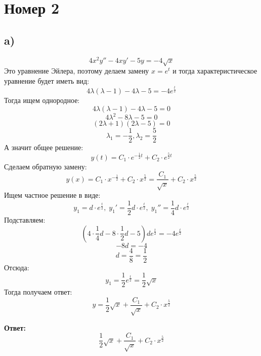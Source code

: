 \documentclass[a4paper,12pt]{article}
\begin{document}
\section*{Номер 2}
\subsection*{a)}
\[
4x^2y'' - 4xy' -5y = -4 \sqrt{x}
\]
Это уравнение Эйлера, поэтому делаем замену $x = e^t$ и тогда характеристическое уравнение будет иметь вид:
\[
4 \lambda (\lambda - 1) - 4 \lambda -5 = - 4 e^{\frac{t}{2}}
\]
Тогда ищем однородное:
\[
4 \lambda (\lambda - 1) - 4 \lambda -5 = 0
\]
\[
4\lambda^2 - 8 \lambda -5 = 0
\]
\[
(2 \lambda + 1)(2\lambda -5) = 0
\]
\[
\lambda_1 = - \frac{1}{2}, \lambda_2 = \frac{5}{2}
\]
А значит общее решение:
\[
y(t) = C_1 \cdot e^{-\frac{1}{2}t}  + C_2 \cdot e^{\frac{5}{2}t}
\]
Сделаем обратную замену:
\[
y(x) = C_1 \cdot x^{-\frac{1}{2}}  + C_2 \cdot x^{\frac{5}{2}}  =  \frac{C_1}{\sqrt{x}} + C_2 \cdot x^{\frac{5}{2}} 
\]
Ищем частное решение в виде:
\[
y_1 = d \cdot e^{\frac{t}{2}}, \;
y_1' = \frac{1}{2} d \cdot  e^{\frac{t}{2}}, \; 
y_1'' = \frac{1}{4} d \cdot  e^{\frac{t}{2}}
\]
Подставляем:
\[
(4 \cdot \frac{1}{4}d - 8 \cdot \frac{1}{2}d - 5)d e^{\frac{t}{2}} =  -4 e^{\frac{t}{2}}
\]
\[
-8d = -4 
\]
\[
d = \frac{4}{8} = \frac{1}{2}
\]
Отсюда:
\[
y_1 = \frac{1}{2}e^{\frac{t}{2}} = \frac{1}{2}\sqrt{x}
\]
Тогда получаем ответ:
\[
y =  \frac{1}{2}\sqrt{x}+ \frac{C_1}{\sqrt{x}} + C_2 \cdot x^{\frac{5}{2}} 
\]
\begin{center}
\textbf{Ответ: } 
\[
\frac{1}{2}\sqrt{x}+ \frac{C_1}{\sqrt{x}} + C_2 \cdot x^{\frac{5}{2}} 
\]
\end{center}
\clearpage
\end{document}
